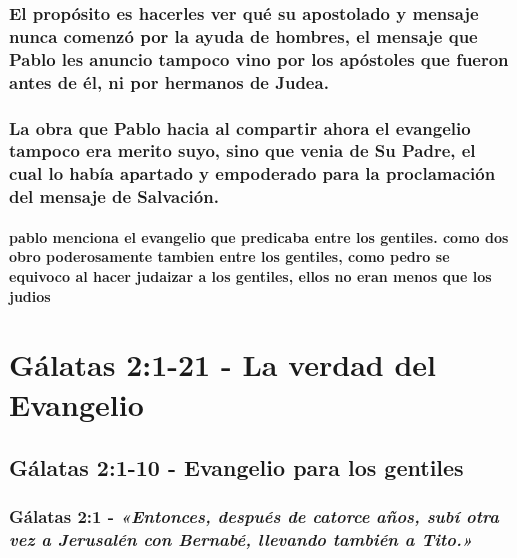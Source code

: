 \documentclass[11a pt,twoside]{article}
\newcommand{\scripture}[1]{%
  {\fontsize{12pt}{16pt}\selectfont\ScriptureFont\itshape #1}%
}
\let\oldsection\section
\renewcommand{\section}{\needspace{6\baselineskip}\oldsection}
\let\oldsubsection\subsection
\renewcommand{\subsection}{\needspace{5\baselineskip}\oldsubsection}
\let\oldsubsubsection\subsubsection
\renewcommand{\subsubsection}{\needspace{4\baselineskip}\oldsubsubsection}
\let\oldparagraph\paragraph
\renewcommand{\paragraph}{\needspace{3\baselineskip}\oldparagraph}
\begin{document}
\subsubsection{El propósito es hacerles ver qué su apostolado y mensaje
nunca comenzó por la ayuda de hombres, el mensaje que Pablo les anuncio
tampoco vino por los apóstoles que fueron antes de él, ni por hermanos
de
Judea.}\label{el-propuxf3sito-es-hacerles-ver-quuxe9-su-apostolado-y-mensaje-nunca-comenzuxf3-por-la-ayuda-de-hombres-el-mensaje-que-pablo-les-anuncio-tampoco-vino-por-los-apuxf3stoles-que-fueron-antes-de-uxe9l-ni-por-hermanos-de-judea.}

\subsubsection{La obra que Pablo hacia al compartir ahora el evangelio
tampoco era merito suyo, sino que venia de Su Padre, el cual lo había
apartado y empoderado para la proclamación del mensaje de
Salvación.}\label{la-obra-que-pablo-hacia-al-compartir-ahora-el-evangelio-tampoco-era-merito-suyo-sino-que-venia-de-su-padre-el-cual-lo-habuxeda-apartado-y-empoderado-para-la-proclamaciuxf3n-del-mensaje-de-salvaciuxf3n.}

\paragraph{pablo menciona el evangelio que predicaba entre los gentiles.
como dos obro poderosamente tambien entre los gentiles, como pedro se
equivoco al hacer judaizar a los gentiles, ellos no eran menos que los
judios}\label{pablo-menciona-el-evangelio-que-predicaba-entre-los-gentiles.-como-dos-obro-poderosamente-tambien-entre-los-gentiles-como-pedro-se-equivoco-al-hacer-judaizar-a-los-gentiles-ellos-no-eran-menos-que-los-judios}

\section{Gálatas 2:1-21 - La verdad del
Evangelio}\label{guxe1latas-21-21---la-verdad-del-evangelio}

\subsection{Gálatas 2:1-10 - Evangelio para los
gentiles}\label{guxe1latas-21-10---evangelio-para-los-gentiles}

\subsubsection{\texorpdfstring{Gálatas 2:1 -
\scripture{«Entonces, después de catorce años, subí otra vez a Jerusalén con Bernabé, llevando también a Tito.»}}{Gálatas 2:1 - }}\label{guxe1latas-21---entonces-despuuxe9s-de-catorce-auxf1os-subuxed-otra-vez-a-jerusaluxe9n-con-bernabuxe9-llevando-tambiuxe9n-a-tito.}
\end{document}
